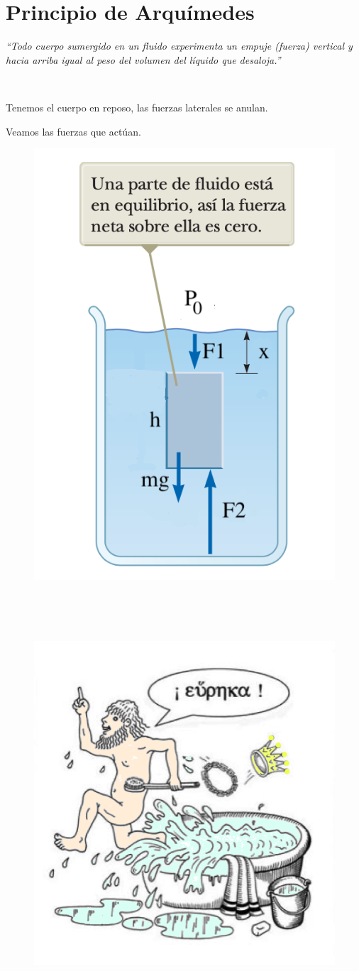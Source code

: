 \section{Principio de Arquímedes}

\emph{``Todo cuerpo sumergido en un fluido experimenta un empuje (fuerza) vertical y hacia arriba igual al peso del volumen del líquido que desaloja.''}

$\quad$

Tenemos el cuerpo en reposo, las fuerzas laterales se anulan. 

Veamos las fuerzas que actúan.



\begin{multicols}{2}
\begin{figure}[H]
	\centering
	\includegraphics[width=.5\textwidth]{imagenes/imagenes07/T07IM09.png}
\end{figure}

$\quad$

$\quad$

\begin{figure}[H]
	\centering
	\includegraphics[width=.5\textwidth]{imagenes/imagenes07/T07IM08.png}
\end{figure}
\end{multicols}



